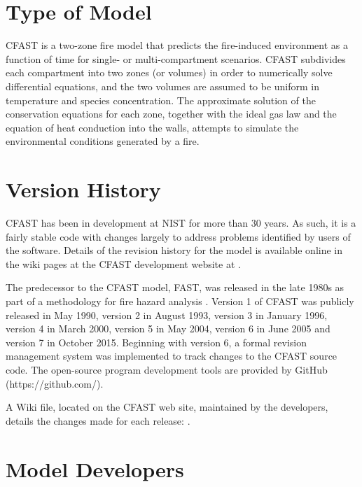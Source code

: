 \documentclass[12pt]{book}
\begin{document}
\section{Type of Model}

CFAST is a two-zone fire model that predicts the fire-induced environment as a function of time for single- or multi-compartment scenarios. CFAST subdivides each compartment into two zones (or volumes) in order to numerically solve differential equations, and the two volumes are assumed to be uniform in temperature and species concentration. The approximate solution of the conservation equations for each zone, together with the ideal gas law and the equation of heat conduction into the walls, attempts to simulate the environmental conditions generated by a fire.

\section{Version History}

CFAST has been in development at NIST for more than 30 years. As such, it is a fairly stable code with changes largely to address problems identified by users of the software.  Details of the revision history for the model is available online in the wiki pages at the CFAST development website at \href{https://github.com/firemodels/cfast/wiki/Version-History}{}.

The predecessor to the CFAST model, FAST, was released in the late 1980s as part of a methodology for fire hazard analysis \cite{Models:HAZARDI, Models:HAZARDI_12}. Version 1 of CFAST was publicly released in May 1990, version 2 in August 1993, version 3 in January 1996, version 4 in March 2000, version 5 in May 2004, version 6 in June 2005 and version 7 in October 2015. Beginning with version 6, a formal revision management system was implemented to track changes to the CFAST source code. The open-source program development tools are provided by GitHub (https://github.com/).

A Wiki file, located on the CFAST web site, maintained by the developers, details the changes made for each release: \href{https://github.com/firemodels/cfast/wiki/Release-Notes}{}.

\section{Model Developers}
\end{document}
